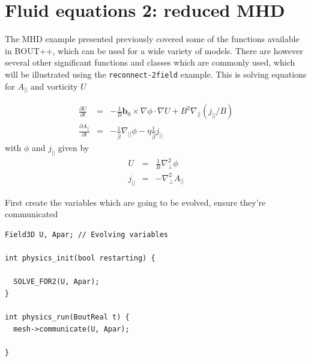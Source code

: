 \documentclass[12pt]{article}
\newcommand{\deriv}[2]{\ensuremath{\frac{\partial #1}{\partial #2}}}
\begin{document}
\section{Fluid equations 2: reduced MHD}

The MHD example presented previously covered some of the functions available in BOUT++,
which can be used for a wide variety of models. There are however several other significant
functions and classes which are commonly used, which will be illustrated using the
\texttt{reconnect-2field} example. This is solving equations for $A_{||}$ and
vorticity $U$

\begin{eqnarray*}
\deriv{U}{t} &=& -\frac{1}{B}\mathbf{b}_0\times\nabla\phi\cdot\nabla U + B^2 \nabla_{||}\left(j_{||} / B\right) \\
\deriv{A_{||}}{t} &=& -\frac{1}{\hat{\beta}}\nabla_{||}\phi - \eta\frac{1}{\hat{\beta}} j_{||}
\end{eqnarray*}
with $\phi$ and $j_{||}$ given by
\begin{eqnarray*}
U &=& \frac{1}{B}\nabla_\perp^2\phi \\
j_{||} &=& -\nabla_\perp^2 A_{||}
\end{eqnarray*}

First create the variables which are going to be evolved, ensure they're
communicated 

\begin{lstlisting}
Field3D U, Apar; // Evolving variables

int physics_init(bool restarting) {
  
  SOLVE_FOR2(U, Apar);
}

int physics_run(BoutReal t) {
  mesh->communicate(U, Apar);
  
}
\end{lstlisting}
\end{document}
